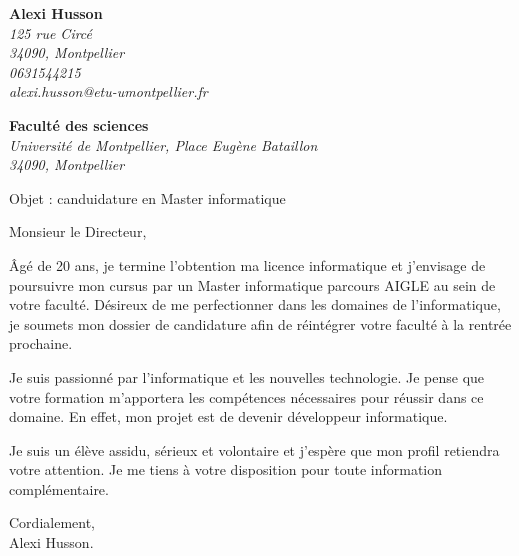 \documentclass[11pt]{letter}
\begin{document}
 \sffamily
 \hfill

 \begin{flushleft}
 {\bfseries Alexi Husson}\\[.35ex]
 \small\itshape
 125 rue Circé\\
 34090, Montpellier\\[.35ex]
 0631544215\\
 alexi.husson@etu-umontpellier.fr
 \end{flushleft}

 \begin{flushright}
 {\bfseries Faculté des sciences}\\[.35ex]
 \small\itshape
Université de Montpellier, Place Eugène Bataillon\\
 34090, Montpellier
 \end{flushright}

Objet : canduidature en Master informatique

\opening{Monsieur le Directeur,}

Âgé de 20 ans, je termine l'obtention ma licence informatique et
j'envisage de poursuivre mon cursus par un Master informatique parcours AIGLE
au sein de votre faculté. Désireux de me perfectionner
dans les domaines de l'informatique, je soumets mon dossier de candidature afin
de réintégrer votre faculté à la rentrée prochaine.

Je suis passionné par l'informatique et les nouvelles technologie. Je pense que
votre formation m'apportera les compétences nécessaires pour réussir dans ce
domaine. En effet, mon projet est de devenir développeur informatique.

Je suis un élève assidu, sérieux et volontaire et j'espère que mon profil
retiendra votre attention. Je me tiens à votre disposition pour toute
information complémentaire.

\closing{Cordialement,\\Alexi Husson.}

\end{document}
